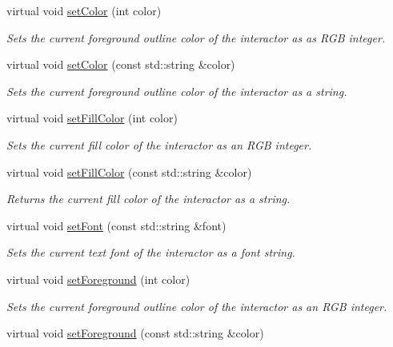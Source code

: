 \begin{DoxyCompactItemize}
virtual void \mbox{\hyperlink{classsgl_1_1GDrawingSurface_a75b9cb32ff80bf061791beb01a8433d0}{set\+Color}} (int color)
\begin{DoxyCompactList}\small\item\em Sets the current foreground outline color of the interactor as as R\+GB integer. \end{DoxyCompactList}\item 
virtual void \mbox{\hyperlink{classsgl_1_1GDrawingSurface_a61374df6c11b52cfbb0815decdbaebc6}{set\+Color}} (const std\+::string \&color)
\begin{DoxyCompactList}\small\item\em Sets the current foreground outline color of the interactor as a string. \end{DoxyCompactList}\item 
virtual void \mbox{\hyperlink{classsgl_1_1GDrawingSurface_a47fad447b715f2f303538434eed26709}{set\+Fill\+Color}} (int color)
\begin{DoxyCompactList}\small\item\em Sets the current fill color of the interactor as an R\+GB integer. \end{DoxyCompactList}\item 
virtual void \mbox{\hyperlink{classsgl_1_1GDrawingSurface_adbc18b1a930aadd97d7437f9f7265b96}{set\+Fill\+Color}} (const std\+::string \&color)
\begin{DoxyCompactList}\small\item\em Returns the current fill color of the interactor as a string. \end{DoxyCompactList}\item 
virtual void \mbox{\hyperlink{classsgl_1_1GDrawingSurface_a8e096e8818d838aceae1d46d58fb3a7b}{set\+Font}} (const std\+::string \&font)
\begin{DoxyCompactList}\small\item\em Sets the current text font of the interactor as a font string. \end{DoxyCompactList}\item 
virtual void \mbox{\hyperlink{classsgl_1_1GDrawingSurface_a7daa57084b5811b598fce8726660b328}{set\+Foreground}} (int color)
\begin{DoxyCompactList}\small\item\em Sets the current foreground outline color of the interactor as an R\+GB integer. \end{DoxyCompactList}\item 
virtual void \mbox{\hyperlink{classsgl_1_1GDrawingSurface_af59209aeadea6dfc6d97a2d8531f50e1}{set\+Foreground}} (const std\+::string \&color)

\end{DoxyCompactItemize}
